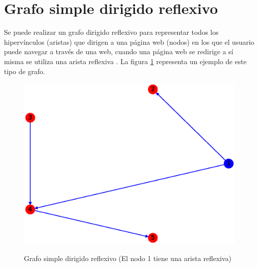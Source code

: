 \documentclass{article}
\begin{document}
\section{Grafo simple dirigido reflexivo}
Se  puede realizar un grafo dirigido reflexivo para representar todos los hipervínculos (aristas) que dirigen a una página web (nodos) en los que el usuario puede navegar a través de una web, cuando una página web se redirige a sí misma se utiliza una arista reflexiva \cite{GSDA}. La figura \ref{fig:GSDR} representa un ejemplo de este tipo de grafo.
\begin{figure}[h!]
    \caption{Grafo simple dirigido reflexivo (El nodo 1 tiene una arista reflexiva)}
    \includegraphics[width=\textwidth]{6-GSDR}
    \label{fig:GSDR}
\end{figure}



\end{document}
